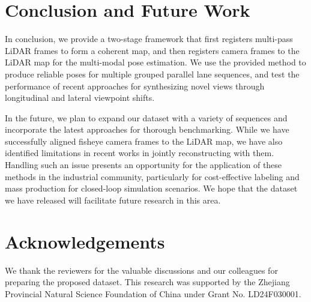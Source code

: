 \section{Conclusion and Future Work}

In conclusion, we provide a two-stage framework that first registers multi-pass LiDAR frames to form a coherent map, and then registers camera frames to the LiDAR map for the multi-modal pose estimation. We use the provided method to produce reliable poses for multiple grouped parallel lane sequences, and test the performance of recent approaches for synthesizing novel views through longitudinal and lateral viewpoint shifts. 

In the future, we plan to expand our dataset with a variety of sequences and incorporate the latest approaches for thorough benchmarking. While we have successfully aligned fisheye camera frames to the LiDAR map, we have also identified limitations in recent works in jointly reconstructing with them. Handling such an issue presents an opportunity for the application of these methods in the industrial community, particularly for cost-effective labeling and mass production for closed-loop simulation scenarios.
We hope that the dataset we have released will facilitate future research in this area.

\section*{Acknowledgements}

We thank the reviewers for the valuable discussions and our colleagues for preparing the proposed dataset. This research was supported by the Zhejiang Provincial Natural Science Foundation of China under Grant No. LD24F030001.
